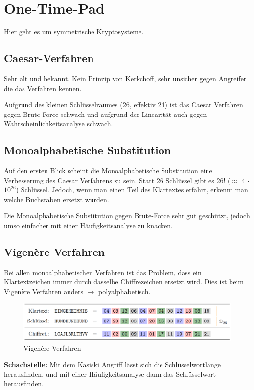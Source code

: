 \chapter{One-Time-Pad}
Hier geht es um symmetrische Kryptosysteme.

\section{Caesar-Verfahren}
Sehr alt und bekannt. Kein Prinzip von Kerkchoff, sehr unsicher gegen Angreifer die das Verfahren kennen.

Aufgrund des kleinen Schlüsselraumes (26, effektiv 24) ist das Caesar Verfahren gegen Brute-Force schwach und aufgrund der Linearität auch gegen Wahrscheinlichkeitsanalyse schwach.

\section{Monoalphabetische Substitution}
Auf den ersten Blick scheint die Monoalphabetische Substitution eine Verbesserung des Caesar Verfahrens zu sein. Statt 26 Schlüssel gibt es 26! ($\approx$ 4 $\cdot$ $\text{10}^{\text{26}}$) Schlüssel. Jedoch, wenn man einen Teil des Klartextes erfährt, erkennt man welche Buchstaben ersetzt wurden.

Die Monoalphabetische Substitution gegen Brute-Force sehr gut geschützt, jedoch umso einfacher mit einer Häufigkeitsanalyse zu knacken.

\section{Vigenère Verfahren}
Bei allen monoalphabetischen Verfahren ist das Problem, dass ein Klartextzeichen immer durch dasselbe Chiffrezeichen ersetzt wird. Dies ist beim Vigenère Verfahren anders $\rightarrow$ polyalphabetisch. 
\begin{figure}[H]
	\centering
	\includegraphics[width=1.0\linewidth]{figures/vigenere.png}
	\caption{Vigenère Verfahren}
\end{figure}
\textbf{Schachstelle:} Mit dem Kasiski Angriff lässt sich die Schlüsselwortlänge herausfinden, und mit einer Häufigkeitsanalyse dann das Schlüsselwort herausfinden.

